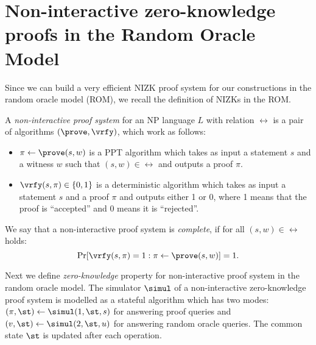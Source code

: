 \section{Non-interactive zero-knowledge proofs in the Random Oracle Model}
Since we can build a very efficient NIZK proof system for our constructions in the random oracle model (ROM), we recall the definition of NIZKs in the ROM.  

\begin{definition} 
A \emph{non-interactive proof system} for an NP language $L$ with relation $\rel$ is a pair of algorithms $(\prove, \vrfy)$, which work as follows:
\begin{itemize}
\item $\pi \leftarrow \prove(s,w)$ is a PPT algorithm which takes as input a statement $s$ and a witness $w$ such that $(s,w) \in \rel$ and outputs a proof $\pi$.
\item $\vrfy(s, \pi) \in \{0,1\}$ is a deterministic algorithm which takes as input a statement $s$ and a proof $\pi$ and outputs either 1 or 0, where 1 means that the proof is ``accepted'' and 0 means it is ``rejected''.
\end{itemize}
We say that a non-interactive proof system is \emph{complete}, if for all $(s, w) \in \rel$ holds:
\[\Pr[\vrfy(s,\pi)=1:\pi \leftarrow \prove(s,w)] =1.\] 
\end{definition}

Next we define \emph{zero-knowledge} property for non-interactive proof system in the random oracle model. The simulator $\simul$ of a non-interactive zero-knowledge proof system is modelled as a stateful algorithm which has two modes: $(\pi, \st) \leftarrow \simul(1, \st, s)$  for answering proof queries and $(v, \st) \leftarrow \simul(2, \st, u)$ for answering random oracle queries. The common state $\st$ is updated after each operation.



